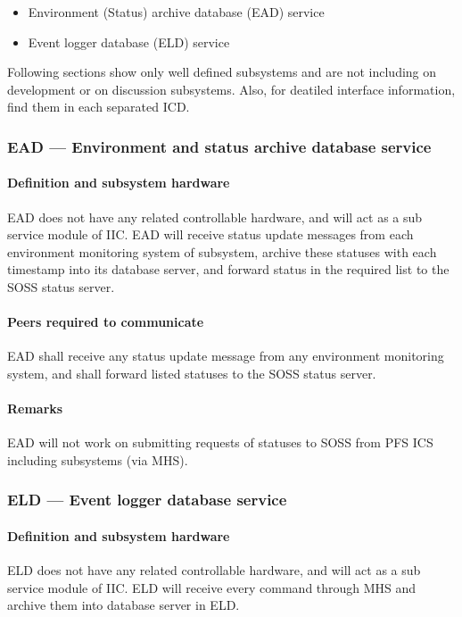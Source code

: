 \documentclass[a4paper,notitlepage]{article}
\begin{document}
\begin{itemize}
  \item Environment (Status) archive database (EAD) service
  \item Event logger database (ELD) service
\end{itemize}


Following sections show only well defined subsystems and are not including 
on development or on discussion subsystems. 
Also, for deatiled interface information, find them in each separated ICD. 


\subsubsection{EAD --- Environment and status archive database service}
\paragraph{Definition and subsystem hardware}
EAD does not have any related controllable hardware, and will act as a sub 
service module of IIC. 
EAD will receive status update messages from each environment monitoring 
system of subsystem, archive these statuses with each timestamp 
into its database server, and forward status in the 
required list to the SOSS status server. 
\paragraph{Peers required to communicate}
EAD shall receive any status update message from any environment monitoring 
system, 
and shall forward listed statuses to the SOSS status server. 
\paragraph{Remarks}
EAD will not work on submitting requests of statuses to SOSS from PFS ICS 
including subsystems (via MHS). 

\subsubsection{ELD --- Event logger database service}
\paragraph{Definition and subsystem hardware}
ELD does not have any related controllable hardware, and will act as a sub 
service module of IIC. 
ELD will receive every command through MHS and archive them into database 
server in ELD. 
\end{document}
